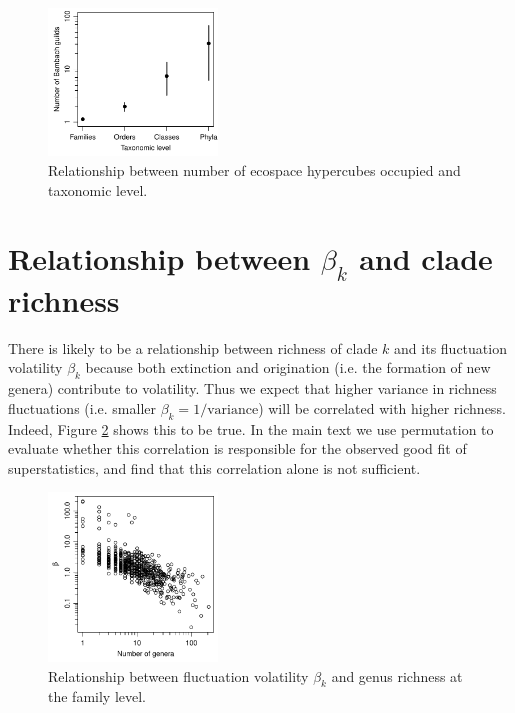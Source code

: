 \documentclass[12pt]{article}
\begin{document}
\begin{figure}[!hp]
  \centering
  \includegraphics[width=0.4\textwidth]{../../figSupp_eeSpaceOcc.pdf} 
  \caption{Relationship between number of ecospace hypercubes occupied
    and taxonomic level.}
  \label{figSupp:eeSpaceOcc}
\end{figure}


\section{Relationship between $\beta_k$ and clade richness}
\label{sec:suppBetaRichness} 

There is likely to be a relationship between richness of clade $k$ and
its fluctuation volatility $\beta_k$ because both extinction and
origination (i.e. the formation of new genera) contribute to
volatility. Thus we expect that higher variance in richness
fluctuations (i.e. smaller $\beta_k = 1/\text{variance}$) will be
correlated with higher richness.  Indeed, Figure
\ref{figSupp:betaByRich} shows this to be true. In the main text we
use permutation to evaluate whether this correlation is responsible
for the observed good fit of superstatistics, and find that this
correlation alone is not sufficient.

\begin{figure}[!hp]
  \centering
  \includegraphics[width=0.4\textwidth]{../../figSupp_betaByRich.pdf} 
  \caption{Relationship between fluctuation volatility $\beta_k$ and
    genus richness at the family level.}
  \label{figSupp:betaByRich}
\end{figure}


% 
\end{document}
